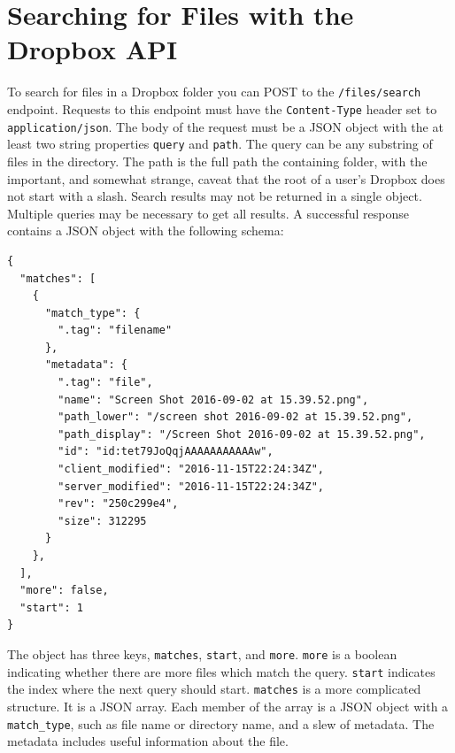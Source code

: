 \documentclass[12pt]{article}
\begin{document}
\section{Searching for Files with the Dropbox API}

To search for files in a Dropbox folder you can POST to the \texttt{/files/search} endpoint. Requests to this endpoint must have the \texttt{Content-Type} header set to \texttt{application/json}. The body of the request must be a JSON object with the at least two string properties \texttt{query} and \texttt{path}. The query can be any substring of files in the directory. The path is the full path the containing folder, with the important, and somewhat strange, caveat that the root of a user's Dropbox does not start with a slash.
Search results may not be returned in a single object. Multiple queries may be necessary to get all results. A successful response contains a JSON object with the following schema:


\begin{verbatim}
{
  "matches": [
    {
      "match_type": {
        ".tag": "filename"
      },
      "metadata": {
        ".tag": "file",
        "name": "Screen Shot 2016-09-02 at 15.39.52.png",
        "path_lower": "/screen shot 2016-09-02 at 15.39.52.png",
        "path_display": "/Screen Shot 2016-09-02 at 15.39.52.png",
        "id": "id:tet79JoQqjAAAAAAAAAAAw",
        "client_modified": "2016-11-15T22:24:34Z",
        "server_modified": "2016-11-15T22:24:34Z",
        "rev": "250c299e4",
        "size": 312295
      }
    },
  ],
  "more": false,
  "start": 1
}
\end{verbatim}

The object has three keys, \texttt{matches}, \texttt{start}, and \texttt{more}. \texttt{more} is a boolean indicating whether there are more files which match the query. \texttt{start} indicates the index where the next query should start. \texttt{matches} is a more complicated structure. It is a JSON array. Each member of the array is a JSON object with a \texttt{match\_type}, such as file name or directory name,  and a slew of metadata. The metadata includes useful information about the file.
\end{document}
